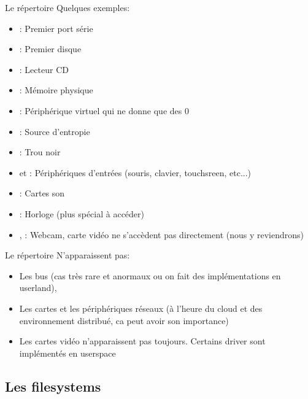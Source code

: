 \begin{frame}[fragile=singleslide]{Le répertoire }
  Quelques exemples:
  \begin{itemize}
  \item {}: Premier port série
  \item {}: Premier disque
  \item {}: Lecteur CD
  \item {}: Mémoire physique
  \item {}: Périphérique virtuel qui ne donne que des 0
  \item {}: Source d'entropie
  \item {}: Trou noir
  \item   {}   et  :   Périphériques
    d'entrées (souris, clavier, touchsreen, etc...)
  \item {}: Cartes son
  \item {}: Horloge (plus spécial à accéder)
  \item {}, : Webcam, carte vidéo ne
    s'accèdent pas directement (nous y reviendrons)
  \end{itemize}
\end{frame}

\begin{frame}[fragile=singleslide]{Le répertoire }
  N'apparaissent pas:
  \begin{itemize}
  \item Les bus (cas très rare et anormaux ou on fait des implémentations
    en userland),
  \item Les cartes  et les périphériques réseaux (à  l'heure du cloud et
    des environnement distribué, ca peut avoir son importance)
  \item  Les cartes  vidéo n'apparaissent  pas toujours.  Certains driver
    sont implémentés en userspace
  \end{itemize}
\end{frame}


\subsection{Les filesystems}

